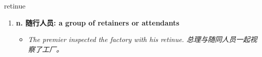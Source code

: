 
\begin{frame}
{\huge retinue}
\begin{center}
\begin{enumerate}\Large
  \item \textbf{n. 随行人员: a group of retainers or attendants}
  \begin{itemize}
    \item \em{\Large{The premier inspected the factory with his retinue. 总理与随同人员一起视察了工厂。}}
  \end{itemize}
\end{enumerate}
\end{center}
\end{frame}
